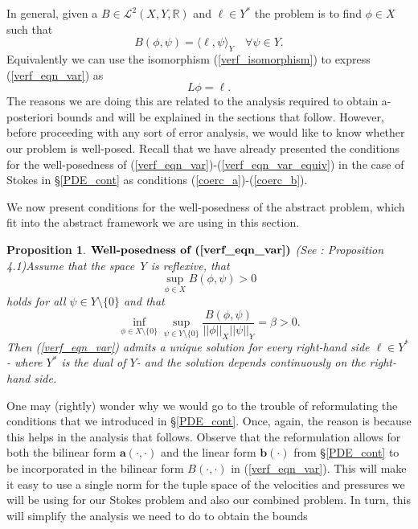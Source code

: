 \documentclass[12pt,a4paper]{article}
\newtheorem{proposition}[theorem]{Proposition}
\theoremstyle{definition}
\begin{document}
In general, given a $B\in \mathcal{L}^2\left(X,Y,\mathbb{R}\right)$ and $\ell \in Y^*$ the problem is to find $\phi \in X$ such that 
\begin{equation}\label{verf_eqn_var}
B\left(\phi,\psi\right)=\langle\ell,\psi\rangle_Y\quad \forall \psi \in Y.
\end{equation}
Equivalently we can use the isomorphism (\ref{verf_isomorphism}) to express (\ref{verf_eqn_var}) as
\begin{equation}\label{verf_eqn_var_equiv}
L\phi=\ell.
\end{equation}
The reasons we are doing this are related to the analysis required to obtain a-posteriori bounds and will be explained in the sections that follow.  However, before proceeding with any sort of error analysis, we would like to know whether our problem is well-posed.   Recall that we have already presented the conditions for the well-posedness of (\ref{verf_eqn_var})-(\ref{verf_eqn_var_equiv}) in the case of Stokes in \S \ref{PDE_cont} as conditions (\ref{coerc_a})-(\ref{coerc_b}).

We now present conditions for the well-posedness of the abstract problem, which   fit into the abstract framework we are using in this section.  
\begin{proposition}{$\textbf{Well-posedness of (\ref{verf_eqn_var})}$} (See \cite[\S4.1.1]{verfurth2013posteriori}:  Proposition 4.1)\label{prop_well_pos_verf}
Assume that the space Y is reflexive, that
\begin{equation}
	\sup_{\phi \in X}B\left(\phi,\psi\right)>0
\end{equation}
holds for all $\psi\in Y\setminus \lbrace 0 \rbrace$ and that
\begin{equation}
	\inf_{\phi\in X\setminus \lbrace0\rbrace}\sup_{\psi \in Y\setminus \lbrace0\rbrace}\frac{B\left(\phi,\psi\right)}{\left|\left|\phi\right|\right|_X\left|\left|\psi\right|\right|_Y}=\beta > 0.
\end{equation}
Then (\ref{verf_eqn_var}) admits a unique solution for every right-hand side $\ell\in Y^*$ - where $Y^*$ is the dual of $Y$- and the solution depends continuously on the right-hand side.
\end{proposition}
One may (rightly) wonder why we would go to the trouble of reformulating the conditions that we introduced in \S \ref{PDE_cont}.  Once, again, the reason is because this helps in the analysis that follows.  Observe that the reformulation allows for both the bilinear form $\textbf{a}\left(\cdot,\cdot\right)$ and the linear form $\textbf{b}\left(\cdot\right)$ from \S \ref{PDE_cont} to be incorporated in the bilinear form $B\left(\cdot,\cdot\right)$ in (\ref{verf_eqn_var}).  This will make it easy to use a single norm for the tuple space of the velocities and pressures we will be using for our Stokes problem and also our combined problem.  In turn, this will simplify the analysis we need to do to obtain the bounds
\end{document}
